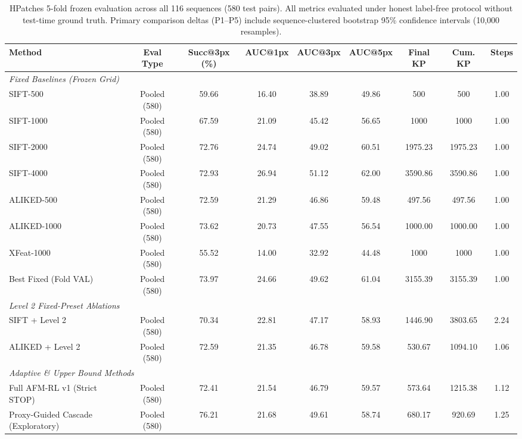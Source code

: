 \documentclass[conference]{IEEEtran}
\begin{document}
\begin{table}[t]
\centering
\setlength{\tabcolsep}{3.5pt}
\caption{HPatches 5-fold frozen evaluation across all 116 sequences (580 test pairs). All metrics evaluated under honest label-free protocol without test-time ground truth. Primary comparison deltas (P1--P5) include sequence-clustered bootstrap 95\% confidence intervals (10,000 resamples).}
\label{tab:hpatches_main}
\small
\begin{tabular}{lcccccccc}
\hline
\textbf{Method} & \textbf{Eval Type} & \textbf{Succ@3px (\%)} & \textbf{AUC@1px} & \textbf{AUC@3px} & \textbf{AUC@5px} & \textbf{Final KP} & \textbf{Cum. KP} & \textbf{Steps} \\
\hline
\multicolumn{9}{l}{\textit{Fixed Baselines (Frozen Grid)}} \\
SIFT-500 & Pooled (580) & 59.66 & 16.40 & 38.89 & 49.86 & 500 & 500 & 1.00 \\
SIFT-1000 & Pooled (580) & 67.59 & 21.09 & 45.42 & 56.65 & 1000 & 1000 & 1.00 \\
SIFT-2000 & Pooled (580) & 72.76 & 24.74 & 49.02 & 60.51 & 1975.23 & 1975.23 & 1.00 \\
SIFT-4000 & Pooled (580) & 72.93 & 26.94 & 51.12 & 62.00 & 3590.86 & 3590.86 & 1.00 \\
ALIKED-500 & Pooled (580) & 72.59 & 21.29 & 46.86 & 59.48 & 497.56 & 497.56 & 1.00 \\
ALIKED-1000 & Pooled (580) & 73.62 & 20.73 & 47.55 & 56.54 & 1000.00 & 1000.00 & 1.00 \\
XFeat-1000 & Pooled (580) & 55.52 & 14.00 & 32.92 & 44.48 & 1000 & 1000 & 1.00 \\
Best Fixed (Fold VAL) & Pooled (580) & 73.97 & 24.66 & 49.62 & 61.04 & 3155.39 & 3155.39 & 1.00 \\
\hline
\multicolumn{9}{l}{\textit{Level 2 Fixed-Preset Ablations}} \\
SIFT + Level 2 & Pooled (580) & 70.34 & 22.81 & 47.17 & 58.93 & 1446.90 & 3803.65 & 2.24 \\
ALIKED + Level 2 & Pooled (580) & 72.59 & 21.35 & 46.78 & 59.58 & 530.67 & 1094.10 & 1.06 \\
\hline
\multicolumn{9}{l}{\textit{Adaptive \& Upper Bound Methods}} \\
Full AFM-RL v1 (Strict STOP) & Pooled (580) & 72.41 & 21.54 & 46.79 & 59.57 & 573.64 & 1215.38 & 1.12 \\
Proxy-Guided Cascade (Exploratory) & Pooled (580) & 76.21 & 21.68 & 49.61 & 58.74 & 680.17 & 920.69 & 1.25 \\

\end{tabular}
\end{table}
\end{document}
